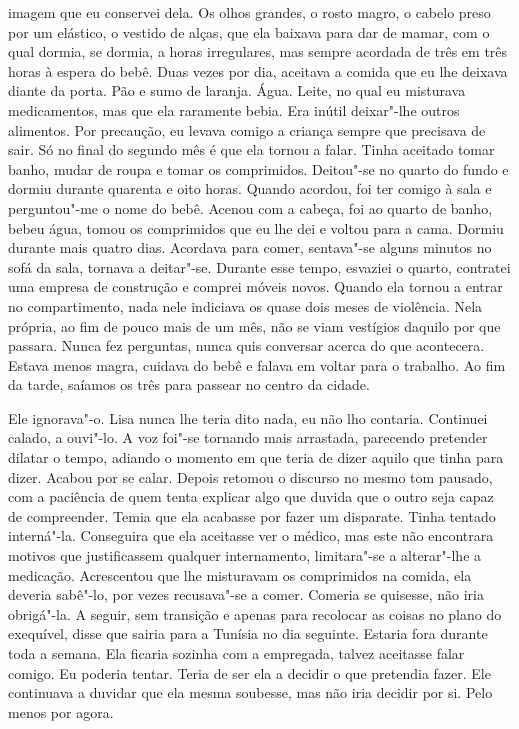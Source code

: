 imagem que eu conservei dela. Os olhos grandes, o rosto magro, o cabelo
preso por um elástico, o vestido de alças, que ela baixava para dar de
mamar, com o qual dormia, se dormia, a horas irregulares, mas sempre
acordada de três em três horas à espera do bebê. Duas vezes por dia,
aceitava a comida que eu lhe deixava diante da porta. Pão e sumo de
laranja. Água. Leite, no qual eu misturava medicamentos, mas que ela
raramente bebia. Era inútil deixar"-lhe outros alimentos. Por precaução,
eu levava comigo a criança sempre que precisava de sair. Só no final do
segundo mês é que ela tornou a falar. Tinha aceitado tomar banho, mudar
de roupa e tomar os comprimidos. Deitou"-se no quarto do fundo e dormiu
durante quarenta e oito horas. Quando acordou, foi ter comigo à sala e
perguntou"-me o nome do bebê. Acenou com a cabeça, foi ao quarto de
banho, bebeu água, tomou os comprimidos que eu lhe dei e voltou para a
cama. Dormiu durante mais quatro dias. Acordava para comer, sentava"-se
alguns minutos no sofá da sala, tornava a deitar"-se. Durante esse
tempo, esvaziei o quarto, contratei uma empresa de construção e comprei
móveis novos. Quando ela tornou a entrar no compartimento, nada nele
indiciava os quase dois meses de violência. Nela própria, ao fim de
pouco mais de um mês, não se viam vestígios daquilo por que passara.
Nunca fez perguntas, nunca quis conversar acerca do que acontecera.
Estava menos magra, cuidava do bebê e falava em voltar para o trabalho.
Ao fim da tarde, saíamos os três para passear no centro da cidade.

Ele ignorava"-o. Lisa nunca lhe teria dito nada, eu não lho contaria.
Continuei calado, a ouvi"-lo. A voz foi"-se tornando mais arrastada,
parecendo pretender dilatar o tempo, adiando o momento em que teria de
dizer aquilo que tinha para dizer. Acabou por se calar. Depois retomou o
discurso no mesmo tom pausado, com a paciência de quem tenta explicar
algo que duvida que o outro seja capaz de compreender. Temia que ela
acabasse por fazer um disparate. Tinha tentado interná"-la. Conseguira
que ela aceitasse ver o médico, mas este não encontrara motivos que
justificassem qualquer internamento, limitara"-se a alterar"-lhe a
medicação. Acrescentou que lhe misturavam os comprimidos na comida, ela
deveria sabê"-lo, por vezes recusava"-se a comer. Comeria se quisesse,
não iria obrigá"-la. A seguir, sem transição e apenas para recolocar as
coisas no plano do exequível, disse que sairia para a Tunísia no dia
seguinte. Estaria fora durante toda a semana. Ela ficaria sozinha com a
empregada, talvez aceitasse falar comigo. Eu poderia tentar. Teria de
ser ela a decidir o que pretendia fazer. Ele continuava a duvidar que
ela mesma soubesse, mas não iria decidir por si. Pelo menos por agora.

